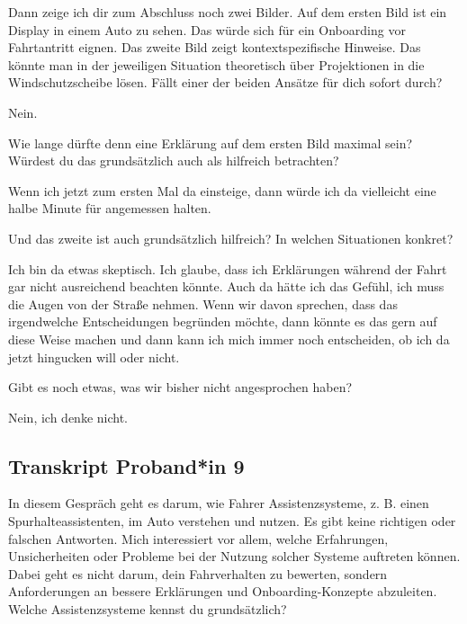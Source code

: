\interviewerin
Dann zeige ich dir zum Abschluss noch zwei Bilder. Auf dem ersten Bild
ist ein Display in einem Auto zu sehen. Das würde sich für ein
Onboarding vor Fahrtantritt eignen. Das zweite Bild zeigt
kontextspezifische Hinweise. Das könnte man in der jeweiligen Situation
theoretisch über Projektionen in die Windschutzscheibe lösen. Fällt
einer der beiden Ansätze für dich sofort durch?

Nein.

\interviewerin
Wie lange dürfte denn eine Erklärung auf dem ersten Bild maximal sein?
Würdest du das grundsätzlich auch als hilfreich betrachten?

Wenn ich jetzt zum ersten Mal da einsteige, dann würde ich da vielleicht
eine halbe Minute für angemessen halten.

\interviewerin
Und das zweite ist auch grundsätzlich hilfreich? In welchen Situationen
konkret?

Ich bin da etwas skeptisch. Ich glaube, dass ich Erklärungen während der
Fahrt gar nicht ausreichend beachten könnte. Auch da hätte ich das
Gefühl, ich muss die Augen von der Straße nehmen. Wenn wir davon
sprechen, dass das irgendwelche Entscheidungen begründen möchte, dann
könnte es das gern auf diese Weise machen und dann kann ich mich immer
noch entscheiden, ob ich da jetzt hingucken will oder nicht.

\interviewerin
Gibt es noch etwas, was wir bisher nicht angesprochen haben?

Nein, ich denke nicht.



\clearpage
\subsection{Transkript Proband*in 9}
\label{subsec:transkript-p9}

\interviewerin
In diesem Gespräch geht es darum, wie Fahrer Assistenzsysteme, z. B.
einen Spurhalteassistenten, im Auto verstehen und nutzen. Es gibt keine
richtigen oder falschen Antworten. Mich interessiert vor allem, welche
Erfahrungen, Unsicherheiten oder Probleme bei der Nutzung solcher
Systeme auftreten können. Dabei geht es nicht darum, dein Fahrverhalten
zu bewerten, sondern Anforderungen an bessere Erklärungen und
Onboarding-Konzepte abzuleiten. Welche Assistenzsysteme kennst du
grundsätzlich?

